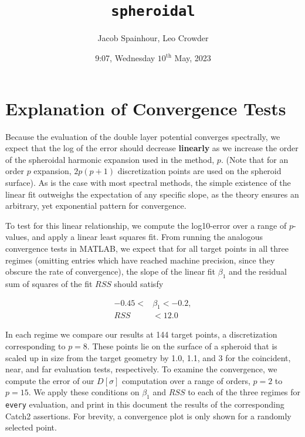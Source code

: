 \documentclass[12pt]{article}
\begin{document}
\title{  \\ \texttt{spheroidal}}

\author{Jacob Spainhour, Leo Crowder}
\date{9:07, Wednesday $10^\text{th}$ May, 2023}

\maketitle

\section*{Explanation of Convergence Tests}

Because the evaluation of the double layer potential converges spectrally, we expect that the log of the error should decrease \textbf{linearly} as we increase the order of the spheroidal harmonic expansion used in the method, $p$.
(Note that for an order $p$ expansion, $2p(p+1)$ discretization points are used on the spheroid surface). As is the case with most spectral methods, the simple existence of the linear fit outweighs the expectation of any specific slope, as the theory ensures an arbitrary, yet exponential pattern for convergence. 

To test for this linear relationship, we compute the log10-error over a range of $p$-values, and apply a linear least squares fit.
From running the analogous convergence tests in MATLAB, we expect that for all target points in all three regimes (omitting entries which have reached machine precision, since they obscure the rate of convergence), the slope of the linear fit $\beta_1$ and the residual sum of squares of the fit $RSS$ should satisfy

\begin{align*}
    -0.45 < &\beta_1< -0.2,\\
    RSS &< 12.0
\end{align*}

In each regime we compare our results at 144 target points, a discretization corresponding to $p=8$. 
These points lie on the surface of a spheroid that is scaled up in size from the target geometry by 1.0, 1.1, and 3 for the coincident, near, and far evaluation tests, respectively. 
To examine the convergence, we compute the error of our $D[\sigma]$ computation over a range of orders, $p=2$ to $p=15$. 
We apply these conditions on $\beta_1$ and $RSS$ to each of the three regimes for \texttt{every} evaluation, and print in this document the results of the corresponding Catch2 assertions. For brevity, a convergence plot is only shown for a randomly selected point.
\end{document}
